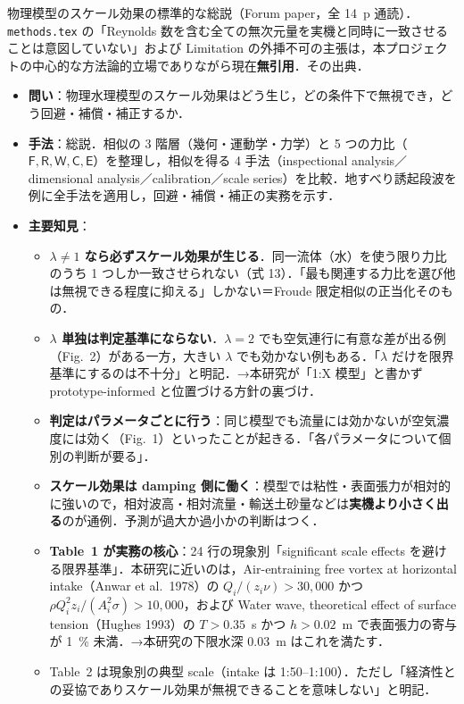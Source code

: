 \documentclass[11pt]{jsarticle}
\newcommand{\litref}[1]{{\large\bfseries\color{citecolor}#1}}
\begin{document}
\noindent\litref{Heller (2011)}\quad 物理模型のスケール効果の標準的な総説（Forum paper，全 14~p 通読）．\texttt{methods.tex} の「Reynolds 数を含む全ての無次元量を実機と同時に一致させることは意図していない」および Limitation の外挿不可の主張は，本プロジェクトの中心的な方法論的立場でありながら現在\textbf{無引用}．その出典．
\begin{itemize}
  \item \textbf{問い}：物理水理模型のスケール効果はどう生じ，どの条件下で無視でき，どう回避・補償・補正するか．
  \item \textbf{手法}：総説．相似の 3 階層（幾何・運動学・力学）と 5 つの力比（$\mathsf{F}, \mathsf{R}, \mathsf{W}, \mathsf{C}, \mathsf{E}$）を整理し，相似を得る 4 手法（inspectional analysis／dimensional analysis／calibration／scale series）を比較．地すべり誘起段波を例に全手法を適用し，回避・補償・補正の実務を示す．
  \item \textbf{主要知見}：
  \begin{itemize}
    \item \textbf{$\lambda \neq 1$ なら必ずスケール効果が生じる}．同一流体（水）を使う限り力比のうち 1 つしか一致させられない（式 13）．「最も関連する力比を選び他は無視できる程度に抑える」しかない＝Froude 限定相似の正当化そのもの．
    \item \textbf{$\lambda$ 単独は判定基準にならない}．$\lambda = 2$ でも空気連行に有意な差が出る例（Fig.~2）がある一方，大きい $\lambda$ でも効かない例もある．「$\lambda$ だけを限界基準にするのは不十分」と明記．→本研究が「1:X 模型」と書かず prototype-informed と位置づける方針の裏づけ．
    \item \textbf{判定はパラメータごとに行う}：同じ模型でも流量には効かないが空気濃度には効く（Fig.~1）といったことが起きる．「各パラメータについて個別の判断が要る」．
    \item \textbf{スケール効果は damping 側に働く}：模型では粘性・表面張力が相対的に強いので，相対波高・相対流量・輸送土砂量などは\textbf{実機より小さく出る}のが通例．予測が過大か過小かの判断はつく．
    \item \textbf{Table~1 が実務の核心}：24 行の現象別「significant scale effects を避ける限界基準」．本研究に近いのは，Air-entraining free vortex at horizontal intake（Anwar et al.\ 1978）の $Q_i/(z_i\nu) > 30{,}000$ かつ $\rho Q_i^2 z_i/(A_i^2\sigma) > 10{,}000$，および Water wave, theoretical effect of surface tension（Hughes 1993）の $T > 0.35$~s かつ $h > 0.02$~m で表面張力の寄与が 1~\% 未満．→本研究の下限水深 0.03~m はこれを満たす．
    \item Table~2 は現象別の典型 scale（intake は 1:50--1:100）．ただし「経済性との妥協でありスケール効果が無視できることを意味しない」と明記．

\end{itemize}
\end{itemize}
\end{document}
